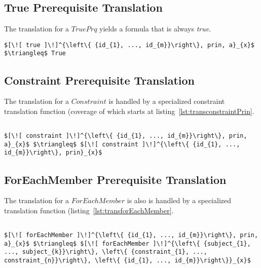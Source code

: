 \subsection{True Prerequisite Translation}
The translation for a $TruePrq$ yields a formula that is always \emph{true}.

\lstset{mathescape, language=AST}  
\begin{lstlisting}[frame=single, caption={Prerequisite Translation {$\colon$} Always True Prerequisite},label={lst:transpreRequisiteTruePrq}]
	$[\![ true ]\!]^{\left\{ {id_{1}, ..., id_{m}}\right\}, prin, a}_{x}$ $\triangleq$ True
\end{lstlisting}

\subsection{Constraint Prerequisite Translation}
The translation for a $Constraint$ is handled by a specialized constraint translation function (coverage of which starts at listing~\ref{lst:transconstraintPrin}.

\lstset{mathescape, language=AST}  
\begin{lstlisting}[frame=single, caption={Prerequisite Translation {$\colon$} Constraint},label={lst:transpreRequisiteConstraint}]

$[\![ constraint ]\!]^{\left\{ {id_{1}, ..., id_{m}}\right\}, prin, a}_{x}$ $\triangleq$ $[\![ constraint ]\!]^{\left\{ {id_{1}, ..., id_{m}}\right\}, prin}_{x}$ 
\end{lstlisting}

\subsection{ForEachMember Prerequisite Translation}
The translation for a $ForEachMember$ is also is handled by a specialized translation function (listing~\ref{lst:transforEachMember}.

\lstset{mathescape, language=AST}  
\begin{lstlisting}[frame=single, caption={Prerequisite Translation {$\colon$} ForEachMember},label={lst:transpreRequisiteForEachMember}]

$[\![ forEachMember ]\!]^{\left\{ {id_{1}, ..., id_{m}}\right\}, prin, a}_{x}$ $\triangleq$ $[\![ forEachMember ]\!]^{\left\{ {subject_{1}, ..., subject_{k}}\right\}, \left\{ {constraint_{1}, ..., constraint_{n}}\right\}, \left\{ {id_{1}, ..., id_{m}}\right\}}_{x}$ 	
\end{lstlisting}

